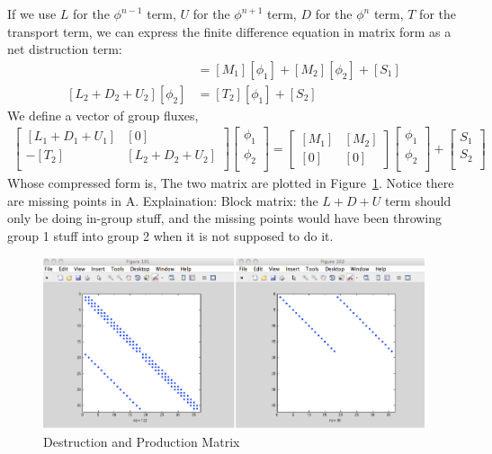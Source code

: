 \documentclass{school-22.211-notes}
\begin{document}
 \label{matrix-representation-of-1d-slab}
If we use $L$ for the $\phi^{n-1}$ term, $U$ for the $\phi^{n+1}$ term, $D$ for the $\phi^n$ term, $T$ for the transport term, we can express the finite difference equation in matrix form as a net distruction term: 
\begin{align}
[L_1 + D_1 + U_1] [\phi_1] &= [M_1] [\phi_1] + [M_2][\phi_2] + [S_1] \\
[L_2 + D_2 + U_2] [\phi_2] &= [T_2] [\phi_1] + [S_2] 
\end{align}
We define a vector of group fluxes, 
\begin{align}
\left[ \begin{array}{cc} 
[L_1 + D_1 + U_1] & [0] \\
-[T_2] & [L_2 + D_2 + U_2] \\
\end{array} \right] 
\left[ \begin{array}{c}
\phi_1 \\ \phi_2 \\ \end{array} \right] 
= \left[ {\begin{array}{cc} \left[M_1\right] & \left[M_2\right] \\ \left[0\right] & \left[0\right] \end{array}} \right] 
\left[ \begin{array}{c}
\phi_1 \\ \phi_2 \\ \end{array} \right] 
+ 
\left[ \begin{array}{c} 
S_1 \\ S_2 \\ \end{array} \right] 
\end{align}
Whose compressed form is, 
\eqn{ [A] [\phi] = [M] [\phi] + [S] }
The two matrix are plotted in Figure~\ref{matrix-form}. Notice there are missing points in A. Explaination: Block matrix: the $L+D+U$ term should only be doing in-group stuff, and the missing points would have been throwing group 1 stuff into group 2 when it is not supposed to do it. 
\begin{figure}[ht]
  \centering
  \includegraphics[width=6in]{images/dfs/matrix-form.png}
  \caption{Destruction and Production Matrix} \label{matrix-form}
\end{figure}
\end{document}
